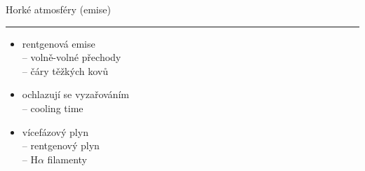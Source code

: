 \documentclass[aspectratio=43]{beamer}
\begin{document}
\begin{frame}{\vspace{-2mm}Horké atmosféry (emise)\phantom{j$^1$}\\\vspace{1.5mm}\hrule}
\vspace{2mm}
\begin{itemize}
    \item<3-> rentgenová emise\\ \vspace{2.4mm}
        -- volně-volné přechody\\ \vspace{2.4mm}
        -- čáry těžkých kovů\\ \vspace{4.5mm}
    \item<5-> ochlazují se vyzařováním\\ \vspace{2.4mm} 
        -- cooling time\\ \vspace{13.5mm}
    \item<7-> vícefázový plyn \\ \vspace{2.4mm}
        -- rentgenový plyn\\ \vspace{2.4mm}
        -- H$\alpha$ filamenty\\ \vspace{4.5mm}
\end{itemize}
\begin{tikzpicture}[overlay]


\end{tikzpicture}
\end{frame}
\end{document}
